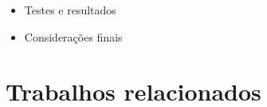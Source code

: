 \documentclass[10pt]{beamer}
\begin{document}
\begin{frame}
\begin{itemize}
    \item[\color{gray}{$\bullet$}] Testes e resultados

    \item[\color{gray}{$\bullet$}] Considerações finais

  \end{itemize}

\end{frame}



\section{Trabalhos relacionados}
\end{document}
